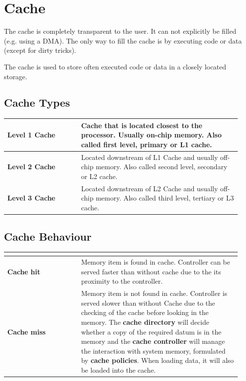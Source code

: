 \section{Cache }
	The cache is completely transparent to the user. It can not explicitly be filled (e.g. using a DMA). The only way to fill the cache is by executing code or data (except for dirty tricks).
	
	The cache is used to store often executed code or data in a closely located storage.
	
	\subsection{Cache Types}
		\begin{longtable}{|>{\bfseries}p{0.3\linewidth}|p{0.65\linewidth}|}
			\hline
			Level 1 Cache
				& Cache that is located closest to the processor. Usually on-chip memory. Also called first level, primary or L1 cache.\\
			\hline
			Level 2 Cache
				& Located downstream of L1 Cache and usually off-chip memory. Also called second level, secondary or L2 cache.\\
			\hline
			Level 3 Cache
				& Located downstream of L2 Cache and usually off-chip memory. Also called third level, tertiary or L3 cache.\\
			\hline	
		\end{longtable}
		
	\subsection{Cache Behaviour }
	
		\begin{table}[H]
			\centering
			\begin{tabular}{|>{\bfseries}p{0.3\linewidth}|p{0.65\linewidth}|}
				\hline
				\multicolumn{2}{|c|}{Controller is looking for a memory item}\\
				\hline
				Cache hit
					& Memory item is found in cache. Controller can be served faster than without cache due to the its proximity to the controller.\\
				\hline
				Cache miss
					& Memory item is not found in cache. Controller is served slower than without Cache due to the checking of the cache before looking in the memory. The \textbf{cache directory} will decide whether a copy of the required datum is in the memory and the \textbf{cache controller} will manage the interaction with system memory, formulated by \textbf{cache policies}. When loading data, it will also be loaded into the cache.\\
				\hline
			\end{tabular}
		\end{table}
		
